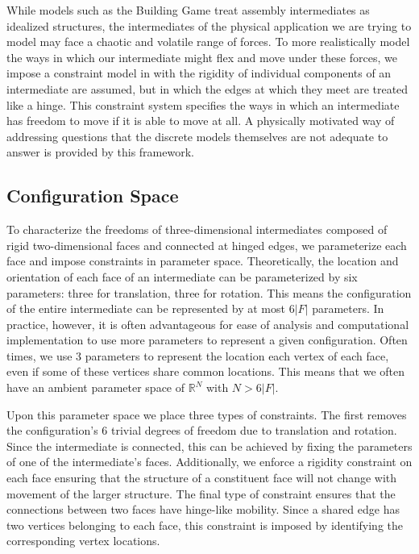 
While models such as the Building Game treat assembly intermediates as idealized structures, the intermediates of the physical application we are trying to model may face a chaotic and volatile range of forces. To more realistically model the ways in which our intermediate might flex and move under these forces, we impose a constraint model in with the rigidity of individual components of an intermediate are assumed, but in which the edges at which they meet are treated like a hinge. This constraint system specifies the ways in which an intermediate has freedom to move if it is able to move at all. A physically motivated way of addressing questions that the discrete models themselves are not adequate to answer is provided by this framework.   

\subsection{Configuration Space}

To characterize the freedoms of three-dimensional intermediates composed of rigid two-dimensional faces and connected at hinged edges, we parameterize each face and impose constraints in parameter space. Theoretically, the location and orientation of each face of an intermediate can be parameterized by six parameters: three for translation, three for rotation. This means the configuration of the entire intermediate can be represented by at most $6|F|$ parameters. In practice, however, it is often advantageous for ease of analysis and computational implementation to use more parameters to represent a given configuration. Often times, we use $3$ parameters to represent the location each vertex of each face, even if some of these vertices share common locations. This means that we often have an ambient parameter space of $\mathbb{R}^N$ with $N > 6|F|$. 

Upon this parameter space we place three types of constraints. The first removes the configuration's 6 trivial degrees of freedom due to translation and rotation. Since the intermediate is connected, this can be achieved by fixing the parameters of one of the intermediate's faces. Additionally, we enforce a rigidity constraint on each face ensuring that the structure of a constituent face will not change with movement of the larger structure. The final type of constraint ensures that the connections between two faces have hinge-like mobility. Since a shared edge has two vertices belonging to each face, this constraint is imposed by identifying the corresponding vertex locations. 

